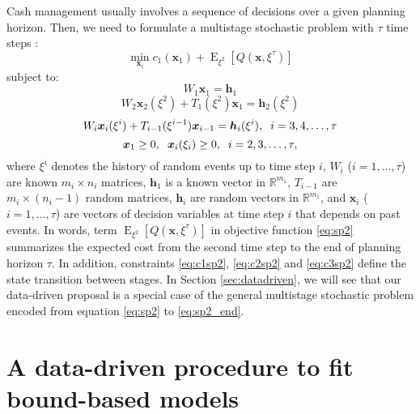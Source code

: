Cash management usually involves a sequence of decisions over a given planning horizon. Then, we need to formulate a multistage stochastic problem with $\tau$ time steps \citep{castro2009stochastic}:
\begin{equation}
\min_{\boldsymbol{x}_i} c_1(\boldsymbol{x}_1) + \operatorname{E}_{\xi^2} \left[ Q(\boldsymbol{x},\xi^{\tau}) \right]
\label{eq:sp2}
\end{equation}
subject to:
\begin{equation}
W_1 \boldsymbol{x}_1 = \boldsymbol{h}_1
\label{eq:c1sp2}
\end{equation}
\begin{equation}
W_2 \boldsymbol{x}_2(\xi^2) + T_1(\xi^2)\boldsymbol{x}_1 = \boldsymbol{h}_2(\xi^2)
\label{eq:c2sp2}
\end{equation}
\begin{equation}
W_i \boldsymbol{x}_i(\xi^i) + T_{i-1}(\xi^{i-1})\boldsymbol{x}_{i-1} = \boldsymbol{h}_i(\xi^i), \hspace{2mm} i = 3, 4, \ldots, \tau
\label{eq:c3sp2}
\end{equation}
\begin{equation}
\boldsymbol{x}_1 \geq 0,\hspace{2mm} \boldsymbol{x}_i(\xi_i) \geq 0, \hspace{2mm} i = 2, 3, \ldots, \tau,
\label{eq:sp2_end}
\end{equation}
where $\xi^i$ denotes the history of random events up to time step $i$, $W_i$ ($i=1, \ldots, \tau$) are known $m_i \times n_i$ matrices, $\boldsymbol{h}_1$ is a known vector in $\mathbb{R}^{m_1}$, $T_{i-1}$ are $m_i \times (n_i - 1)$ random matrices, $\boldsymbol{h}_i$ are random vectors in $\mathbb{R}^{m_1}$, and $\boldsymbol{x}_i$ ($i = 1, \ldots, \tau$) are vectors of decision variables at time step $i$ that depends on past events. In words, term $\operatorname{E}_{\xi^2} \left[ Q(\boldsymbol{x},\xi^{\tau}) \right]$ in objective function \eqref{eq:sp2} summarizes the expected cost from the second time step to the end of planning horizon $\tau$. In addition, constraints \eqref{eq:c1sp2}, \eqref{eq:c2sp2} and \eqref{eq:c3sp2} define the state transition between stages. In Section \ref{sec:datadriven}, we will see that our data-driven proposal is a special case of the general multistage stochastic problem encoded from equation \eqref{eq:sp2} to \eqref{eq:sp2_end}.


\section{A data-driven procedure to fit bound-based models\label{sec:datadriven}}


